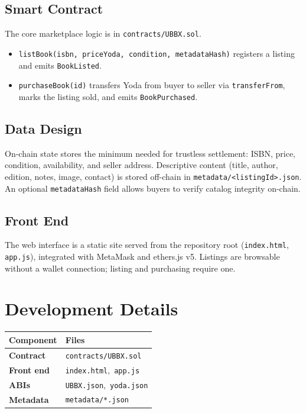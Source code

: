 \documentclass[11pt,letterpaper]{article}
\begin{document}
\subsection*{Smart Contract}

The core marketplace logic is in \texttt{contracts/UBBX.sol}.

\begin{itemize}
  \item \texttt{listBook(isbn, priceYoda, condition, metadataHash)} registers a
        listing and emits \texttt{BookListed}.
  \item \texttt{purchaseBook(id)} transfers Yoda from buyer to seller via
        \texttt{transferFrom}, marks the listing sold, and emits
        \texttt{BookPurchased}.
\end{itemize}

\subsection*{Data Design}

On-chain state stores the minimum needed for trustless settlement: ISBN, price,
condition, availability, and seller address. Descriptive content (title, author,
edition, notes, image, contact) is stored off-chain in
\texttt{metadata/<listingId>.json}. An optional \texttt{metadataHash} field
allows buyers to verify catalog integrity on-chain.

\subsection*{Front End}

The web interface is a static site served from the repository root
(\texttt{index.html}, \texttt{app.js}), integrated with MetaMask and ethers.js v5.
Listings are browsable without a wallet connection; listing and purchasing require
one.

\section{Development Details}

\begin{center}
\begin{tabular}{@{} >{\bfseries}l l @{}}
\toprule
Component    & Files \\
\midrule
Contract     & \texttt{contracts/UBBX.sol} \\
Front end    & \texttt{index.html},\ \texttt{app.js} \\
ABIs         & \texttt{UBBX.json},\ \texttt{yoda.json} \\
Metadata     & \texttt{metadata/*.json} \\
\bottomrule
\end{tabular}
\end{center}
\end{document}
